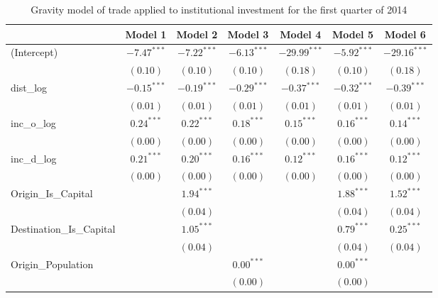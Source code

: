\begin{table}
	\small
	\begin{center}
		\caption[CGravity Model of Trade for Q1 2014]{Gravity model of trade applied to institutional investment for the first quarter of 2014}
		\begin{tabular}{l c c c c c c }
			\hline
			& Model 1 & Model 2 & Model 3 & Model 4 & Model 5 & Model 6 \\
			\hline
			(Intercept)                  & $-7.47^{***}$ & $-7.22^{***}$ & $-6.13^{***}$ & $-29.99^{***}$ & $-5.92^{***}$ & $-29.16^{***}$ \\
			& $(0.10)$      & $(0.10)$      & $(0.10)$      & $(0.18)$       & $(0.10)$      & $(0.18)$       \\
			dist\_log                    & $-0.15^{***}$ & $-0.19^{***}$ & $-0.29^{***}$ & $-0.37^{***}$  & $-0.32^{***}$ & $-0.39^{***}$  \\
			& $(0.01)$      & $(0.01)$      & $(0.01)$      & $(0.01)$       & $(0.01)$      & $(0.01)$       \\
			inc\_o\_log                  & $0.24^{***}$  & $0.22^{***}$  & $0.18^{***}$  & $0.15^{***}$   & $0.16^{***}$  & $0.14^{***}$   \\
			& $(0.00)$      & $(0.00)$      & $(0.00)$      & $(0.00)$       & $(0.00)$      & $(0.00)$       \\
			inc\_d\_log                  & $0.21^{***}$  & $0.20^{***}$  & $0.16^{***}$  & $0.12^{***}$   & $0.16^{***}$  & $0.12^{***}$   \\
			& $(0.00)$      & $(0.00)$      & $(0.00)$      & $(0.00)$       & $(0.00)$      & $(0.00)$       \\
			Origin\_Is\_Capital          &               & $1.94^{***}$  &               &                & $1.88^{***}$  & $1.52^{***}$   \\
			&               & $(0.04)$      &               &                & $(0.04)$      & $(0.04)$       \\
			Destination\_Is\_Capital     &               & $1.05^{***}$  &               &                & $0.79^{***}$  & $0.25^{***}$   \\
			&               & $(0.04)$      &               &                & $(0.04)$      & $(0.04)$       \\
			Origin\_Population           &               &               & $0.00^{***}$  &                & $0.00^{***}$  &                \\
			&               &               & $(0.00)$      &                & $(0.00)$      &                \\

\end{tabular}
\end{center}
\end{table}
